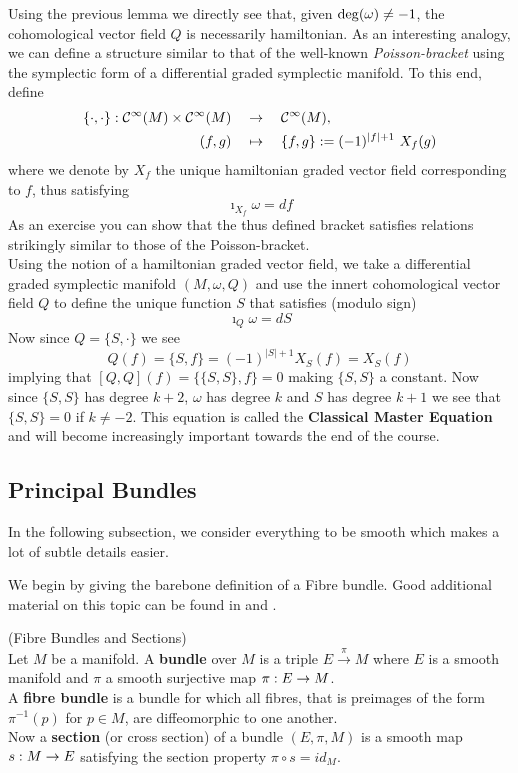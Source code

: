 Using the previous lemma we directly see that, given $\operatorname{deg}(\omega) \neq -1$, the cohomological vector field $Q$ is necessarily hamiltonian. As an interesting analogy, we can define a structure similar to that of the well-known \emph{Poisson-bracket} using the symplectic form of a differential graded symplectic manifold. To this end, define
\begin{align*}
  \{\cdot, \cdot \} : \mathcal{C}^{\infty}(M) \times \mathcal{C}^{\infty}(M) \quad &\rightarrow \quad \mathcal{C}^{\infty}(M),\\
  (f,g) \quad &\mapsto \quad \{f,g\} := (-1)^{|f|+1} \ X_f(g)
\end{align*}
where we denote by $X_f$ the unique hamiltonian graded vector field corresponding to $f$, thus satisfying
$$ \imath_{X_f}\omega = df $$
As an exercise you can show that the thus defined bracket satisfies relations strikingly similar to those of the Poisson-bracket.\\

Using the notion of a hamiltonian graded vector field, we take a differential graded symplectic manifold $(M,\omega, Q)$ and use the innert cohomological vector field $Q$ to define the unique function $S$ that satisfies (modulo sign)
$$ \imath_Q \omega = dS $$
Now since $Q = \{S,\cdot\}$ we see
$$ Q(f) = \{S, f\} = (-1)^{|S|+1} X_S(f) = X_S(f) $$
implying that $[Q,Q](f) = \{\{S,S\},f\} = 0$ making $\{S,S\}$ a constant. Now since $\{S,S\}$ has degree $k+2$, $\omega$ has degree $k$ and $S$ has degree $k+1$ we see that $\{S,S\} = 0$ if $k \neq -2$. This equation is called the \textbf{Classical Master Equation} and will become increasingly important towards the end of the course.

\newpage
\subsection{Principal Bundles}

\begin{rem}
  In the following subsection, we consider everything to be smooth which makes a lot of subtle details easier.
\end{rem}

We begin by giving the barebone definition of a Fibre bundle. Good additional material on this topic can be found in   and .

\begin{definition} (Fibre Bundles and Sections)\\
  Let $M$ be a manifold. A \textbf{bundle} over $M$ is a triple $E\overset{\pi}{\longrightarrow}M$ where $E$ is a smooth manifold and $\pi$ a smooth surjective map $\pi:E\rightarrow M$.\\
  A \textbf{fibre bundle} is a bundle for which all fibres, that is preimages of the form $\pi^{-1}(p)$ for $p\in M$, are diffeomorphic to one another.\\
  Now a \textbf{section} (or cross section) of a bundle $(E,\pi,M)$ is a smooth map $s:M\rightarrow E$ satisfying the section property $\pi \circ s = id_M$.
\end{definition}


